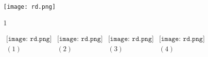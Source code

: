 \lipsum[1-4]
\begin{figure}
	\centering
	\texttt{[image: rd.png]}
	\caption{1}
\end{figure}
\lipsum[1-6]


\begin{figure}[h]
\begin{center}$
\begin{array}{cccc}
	\texttt{[image: rd.png]}&
	\texttt{[image: rd.png]}&
	\texttt{[image: rd.png]}&
	\texttt{[image: rd.png]}\\
	(1) & (2) & (3) & (4)
\end{array}$
\end{center}
\end{figure}

